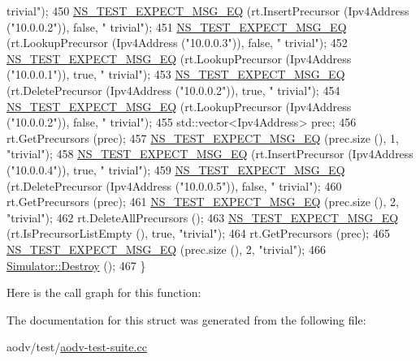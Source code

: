 \begin{DoxyCode}
{      trivial"});
450     \hyperlink{group__testing_ga7304ba46a28d8cf08dfdfd6499cf7068}{NS\_TEST\_EXPECT\_MSG\_EQ} (rt.InsertPrecursor (Ipv4Address (\textcolor{stringliteral}{"10.0.0.2"})), \textcolor{keyword}{false}, \textcolor{stringliteral}{"
      trivial"});
451     \hyperlink{group__testing_ga7304ba46a28d8cf08dfdfd6499cf7068}{NS\_TEST\_EXPECT\_MSG\_EQ} (rt.LookupPrecursor (Ipv4Address (\textcolor{stringliteral}{"10.0.0.3"})), \textcolor{keyword}{false}, \textcolor{stringliteral}{"
      trivial"});
452     \hyperlink{group__testing_ga7304ba46a28d8cf08dfdfd6499cf7068}{NS\_TEST\_EXPECT\_MSG\_EQ} (rt.LookupPrecursor (Ipv4Address (\textcolor{stringliteral}{"10.0.0.1"})), \textcolor{keyword}{true}, \textcolor{stringliteral}{"
      trivial"});
453     \hyperlink{group__testing_ga7304ba46a28d8cf08dfdfd6499cf7068}{NS\_TEST\_EXPECT\_MSG\_EQ} (rt.DeletePrecursor (Ipv4Address (\textcolor{stringliteral}{"10.0.0.2"})), \textcolor{keyword}{true}, \textcolor{stringliteral}{"
      trivial"});
454     \hyperlink{group__testing_ga7304ba46a28d8cf08dfdfd6499cf7068}{NS\_TEST\_EXPECT\_MSG\_EQ} (rt.LookupPrecursor (Ipv4Address (\textcolor{stringliteral}{"10.0.0.2"})), \textcolor{keyword}{false}, \textcolor{stringliteral}{"
      trivial"});
455     std::vector<Ipv4Address> prec;
456     rt.GetPrecursors (prec);
457     \hyperlink{group__testing_ga7304ba46a28d8cf08dfdfd6499cf7068}{NS\_TEST\_EXPECT\_MSG\_EQ} (prec.size (), 1, \textcolor{stringliteral}{"trivial"});
458     \hyperlink{group__testing_ga7304ba46a28d8cf08dfdfd6499cf7068}{NS\_TEST\_EXPECT\_MSG\_EQ} (rt.InsertPrecursor (Ipv4Address (\textcolor{stringliteral}{"10.0.0.4"})), \textcolor{keyword}{true}, \textcolor{stringliteral}{"
      trivial"});
459     \hyperlink{group__testing_ga7304ba46a28d8cf08dfdfd6499cf7068}{NS\_TEST\_EXPECT\_MSG\_EQ} (rt.DeletePrecursor (Ipv4Address (\textcolor{stringliteral}{"10.0.0.5"})), \textcolor{keyword}{false}, \textcolor{stringliteral}{"
      trivial"});
460     rt.GetPrecursors (prec);
461     \hyperlink{group__testing_ga7304ba46a28d8cf08dfdfd6499cf7068}{NS\_TEST\_EXPECT\_MSG\_EQ} (prec.size (), 2, \textcolor{stringliteral}{"trivial"});
462     rt.DeleteAllPrecursors ();
463     \hyperlink{group__testing_ga7304ba46a28d8cf08dfdfd6499cf7068}{NS\_TEST\_EXPECT\_MSG\_EQ} (rt.IsPrecursorListEmpty (), \textcolor{keyword}{true}, \textcolor{stringliteral}{"trivial"});
464     rt.GetPrecursors (prec);
465     \hyperlink{group__testing_ga7304ba46a28d8cf08dfdfd6499cf7068}{NS\_TEST\_EXPECT\_MSG\_EQ} (prec.size (), 2, \textcolor{stringliteral}{"trivial"});
466     \hyperlink{classns3_1_1Simulator_a2a056e59a6623225df0957eda0ee8252}{Simulator::Destroy} ();
467   \}
\end{DoxyCode}


Here is the call graph for this function\+:




The documentation for this struct was generated from the following file\+:\begin{DoxyCompactItemize}
\item 
aodv/test/\hyperlink{aodv-test-suite_8cc}{aodv-\/test-\/suite.\+cc}\end{DoxyCompactItemize}
